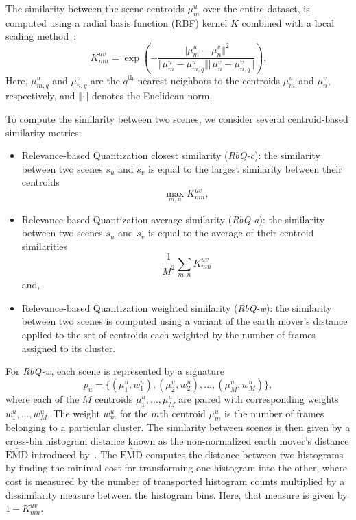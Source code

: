 \documentclass[smallextended]{svjour3}
\newcommand*{\EMD}{\mathrm{EMD}}
\begin{document}
The similarity between the scene centroids $\mu_m^u$ over the entire dataset, is computed using a radial basis function (RBF) kernel $K$ combined with a local scaling method~\cite{selfTuneManor2004}:
\begin{equation}
\label{eq:kc}
K_{mn}^{uv} = \exp\left( - \dfrac{\Vert \mu_m^u - \mu_n^v \Vert^2}{\Vert \mu_m^u - \mu_{m,q}^u \Vert \Vert \mu_n^v - \mu_{n,q}^v \Vert} \right).
\end{equation}
Here, $\mu_{m,q}^u$ and $\mu_{n,q}^v$ are the $q^{\textrm{th}}$ nearest neighbors to the centroids $\mu_m^u$ and $\mu_n^v$, respectively, and $\Vert \cdot \Vert$ denotes the Euclidean norm.

To compute the similarity between two scenes, we consider several centroid-based similarity metrics:
\begin{itemize}
\item Relevance-based Quantization closest similarity (\emph{RbQ-c}): the similarity between two scenes $s_u$ and $s_v$ is equal to the largest similarity between their centroids
\begin{equation}
	\max_{m,n} K_{mn}^{uv},
\end{equation}
\item Relevance-based Quantization average similarity  (\emph{RbQ-a}): the similarity between two scenes $s_u$ and $s_v$ is equal to the average of their centroid similarities
\begin{equation}
	\frac{1}{M^2} \sum_{m,n} K_{mn}^{uv}
\end{equation}
and,
\item Relevance-based Quantization weighted similarity  (\emph{RbQ-w}): the similarity between two scenes is computed using a variant of the earth mover's distance applied to the set of centroids each weighted by the number of frames assigned to its cluster.
\end{itemize}

For \emph{RbQ-w}, each scene is represented by a signature
$$
p_u = \lbrace(\mu_1^u,w_1^u),(\mu_2^u,w_2^u),\ldots,(\mu_M^u,w_M^u)\rbrace,
$$
where each of the $M$ centroids $\mu_1^u, \ldots, \mu_M^u$ are paired with corresponding weights $w_1^u, \ldots, w_M^u$. The weight $w_m^u$ for the $m$th centroid $\mu_m^u$ is the number of frames belonging to a particular cluster. The similarity between scenes is then given by a cross-bin histogram distance known as the non-normalized earth mover's distance $\widehat{\EMD}$ introduced by~\cite{pele2008linear}. The $\widehat{\EMD}$ computes the distance between two histograms by finding the minimal cost for transforming one histogram into the other, where cost is measured by the number of transported histogram counts multiplied by a dissimilarity measure between the histogram bins. Here, that measure is given by $1-K_{mn}^{uv}$.
\end{document}
